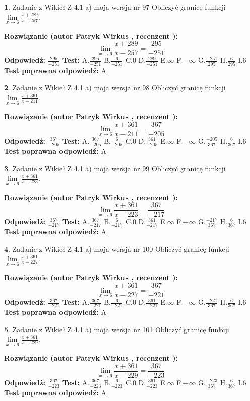 \documentclass[12pt, a4paper]{article}
\theoremstyle{definition} %
\newtheorem{zad}{}
\newcommand{\zadStart}[1]{\begin{zad}#1\newline}
\newcommand{\zadStop}{\end{zad}}
\newcommand{\rozwStart}[2]{\noindent \textbf{Rozwiązanie (autor #1 , recenzent #2): }\newline}
\newcommand{\rozwStop}{\newline}
\newcommand{\odpStart}{\noindent \textbf{Odpowiedź:}\newline}
\newcommand{\odpStop}{\newline}
\newcommand{\testStart}{\noindent \textbf{Test:}\newline}
\newcommand{\testStop}{\newline}
\newcommand{\kluczStart}{\noindent \textbf{Test poprawna odpowiedź:}\newline}
\newcommand{\kluczStop}{\newline}
\begin{document}
\zadStart{Zadanie z Wikieł Z 4.1 a) moja wersja nr 97}
Obliczyć granicę funkcji $\lim\limits_{x\to6}\frac{x+289}{x-257}$.
\zadStop
\rozwStart{Patryk Wirkus}{}
$$\lim\limits_{x\to6}\frac{x+289}{x-257} = \frac{295}{-251}$$
\rozwStop
\odpStart
$\frac{295}{-251}$
\odpStop
\testStart
A.$\frac{295}{-251}$
B.$\frac{6}{-251}$
C.$0$
D.$\frac{289}{-251}$
E.$\infty$
F.$-\infty$
G.$\frac{-251}{295}$
H.$\frac{6}{295}$
I.$6$
\testStop
\kluczStart
A
\kluczStop



\zadStart{Zadanie z Wikieł Z 4.1 a) moja wersja nr 98}
Obliczyć granicę funkcji $\lim\limits_{x\to6}\frac{x+361}{x-211}$.
\zadStop
\rozwStart{Patryk Wirkus}{}
$$\lim\limits_{x\to6}\frac{x+361}{x-211} = \frac{367}{-205}$$
\rozwStop
\odpStart
$\frac{367}{-205}$
\odpStop
\testStart
A.$\frac{367}{-205}$
B.$\frac{6}{-205}$
C.$0$
D.$\frac{361}{-205}$
E.$\infty$
F.$-\infty$
G.$\frac{-205}{367}$
H.$\frac{6}{367}$
I.$6$
\testStop
\kluczStart
A
\kluczStop



\zadStart{Zadanie z Wikieł Z 4.1 a) moja wersja nr 99}
Obliczyć granicę funkcji $\lim\limits_{x\to6}\frac{x+361}{x-223}$.
\zadStop
\rozwStart{Patryk Wirkus}{}
$$\lim\limits_{x\to6}\frac{x+361}{x-223} = \frac{367}{-217}$$
\rozwStop
\odpStart
$\frac{367}{-217}$
\odpStop
\testStart
A.$\frac{367}{-217}$
B.$\frac{6}{-217}$
C.$0$
D.$\frac{361}{-217}$
E.$\infty$
F.$-\infty$
G.$\frac{-217}{367}$
H.$\frac{6}{367}$
I.$6$
\testStop
\kluczStart
A
\kluczStop



\zadStart{Zadanie z Wikieł Z 4.1 a) moja wersja nr 100}
Obliczyć granicę funkcji $\lim\limits_{x\to6}\frac{x+361}{x-227}$.
\zadStop
\rozwStart{Patryk Wirkus}{}
$$\lim\limits_{x\to6}\frac{x+361}{x-227} = \frac{367}{-221}$$
\rozwStop
\odpStart
$\frac{367}{-221}$
\odpStop
\testStart
A.$\frac{367}{-221}$
B.$\frac{6}{-221}$
C.$0$
D.$\frac{361}{-221}$
E.$\infty$
F.$-\infty$
G.$\frac{-221}{367}$
H.$\frac{6}{367}$
I.$6$
\testStop
\kluczStart
A
\kluczStop



\zadStart{Zadanie z Wikieł Z 4.1 a) moja wersja nr 101}
Obliczyć granicę funkcji $\lim\limits_{x\to6}\frac{x+361}{x-229}$.
\zadStop
\rozwStart{Patryk Wirkus}{}
$$\lim\limits_{x\to6}\frac{x+361}{x-229} = \frac{367}{-223}$$
\rozwStop
\odpStart
$\frac{367}{-223}$
\odpStop
\testStart
A.$\frac{367}{-223}$
B.$\frac{6}{-223}$
C.$0$
D.$\frac{361}{-223}$
E.$\infty$
F.$-\infty$
G.$\frac{-223}{367}$
H.$\frac{6}{367}$
I.$6$
\testStop
\kluczStart
A
\kluczStop
\end{document}

